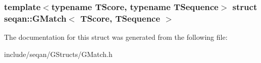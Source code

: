 \subsubsection*{template$<$typename \-T\-Score, typename \-T\-Sequence$>$ struct seqan\-::\-G\-Match$<$ T\-Score, T\-Sequence $>$}



\-The documentation for this struct was generated from the following file\-:\begin{DoxyCompactItemize}
\item 
include/seqan/\-G\-Structs/\-G\-Match.\-h\end{DoxyCompactItemize}
